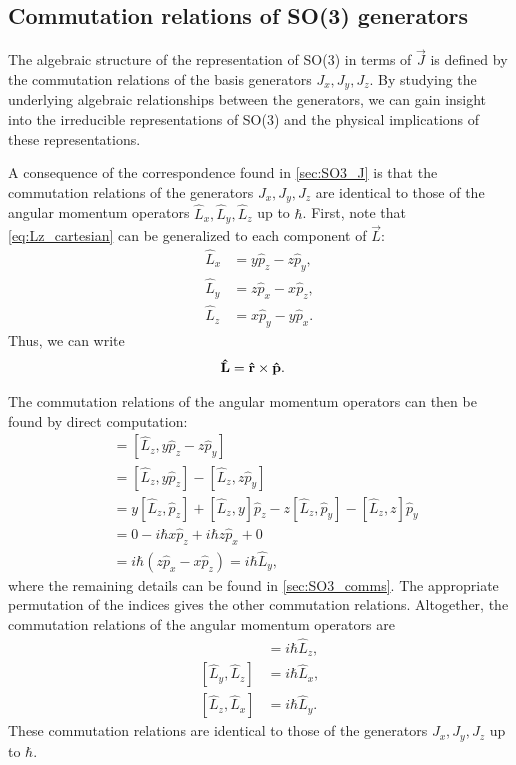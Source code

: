     \subsection{Commutation relations of SO(3) generators}\label{sub:SO3_comms}
    The algebraic structure of the representation of SO(3) in terms of $\vec{J}$ is defined by the commutation relations of the basis generators $J_x,J_y,J_z$. By studying the underlying algebraic relationships between the generators, we can gain insight into the irreducible representations of SO(3) and the physical implications of these representations.
    
    A consequence of the correspondence found in \cref{sec:SO3_J} is that the commutation relations of the generators $J_x,J_y,J_z$ are identical to those of the angular momentum operators $\hat{L}_x,\hat{L}_y,\hat{L}_z$ up to $\hbar$. First, note that \cref{eq:Lz_cartesian} can be generalized to each component of $\vec{L}$:
    \begin{align}
        \hat{L}_x &= y \hat{p}_z - z \hat{p}_y, \\
        \hat{L}_y &= z \hat{p}_x - x \hat{p}_z, \\
        \hat{L}_z &= x \hat{p}_y - y \hat{p}_x.
    \end{align}
    Thus, we can write
    \begin{align}
        \mathbf{\hat{L}} &= \mathbf{\hat{r}}\times\mathbf{\hat{p}}.
    \end{align}

    The commutation relations of the angular momentum operators can then be found by direct computation:
    \begin{align*}
        [\hat{L}_z,\hat{L}_x]
            &= [\hat{L}_z, y \hat{p}_z-z\hat{p}_y] \\
            &= [\hat{L}_z, y \hat{p}_z] - [\hat{L}_z, z\hat{p}_y] \\
            &= y[\hat{L}_z, \hat{p}_z] + [\hat{L}_z, y]\hat{p}_z - z[\hat{L}_z, \hat{p}_y] - [\hat{L}_z, z]\hat{p}_y \\
            &= 0 - i\hbar x\hat{p}_z + i\hbar z\hat{p}_x + 0 \\
            &= i\hbar(z\hat{p}_x - x\hat{p}_z) = i\hbar\hat{L}_y,
    \end{align*}
    where the remaining details can be found in \cref{sec:SO3_comms}. The appropriate permutation of the indices gives the other commutation relations. Altogether, the commutation relations of the angular momentum operators are
    \begin{align}
        [\hat{L}_x,\hat{L}_y] &= i\hbar\hat{L}_z, \label{eq:comLz} \\
        [\hat{L}_y,\hat{L}_z] &= i\hbar\hat{L}_x, \label{eq:comLx} \\
        [\hat{L}_z,\hat{L}_x] &= i\hbar\hat{L}_y. \label{eq:comLy}
    \end{align}
    These commutation relations are identical to those of the generators $J_x,J_y,J_z$ up to $\hbar$.

